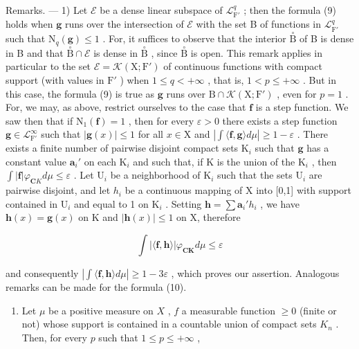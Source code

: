 Remarks. --- 1) Let \(\mathcal{E}\) be a dense linear subspace of \(\mathcal{L}_{\mathrm{F}'}^q\) ; then the formula (9) holds when \(\mathbf{g}\) runs over the intersection of \(\mathcal{E}\) with the set B of functions in \(\mathcal{L}_{\mathrm{F}'}^q\) such that \(\mathrm{N}_q(\mathbf{g}) \leqslant 1\) . For, it suffices to observe that the interior \(\overset{\circ}{\mathrm{B}}\) of B is dense in B and that \(\overset{\circ}{\mathrm{B}} \cap \mathcal{E}\) is dense in \(\overset{\circ}{\mathrm{B}}\) , since \(\overset{\circ}{\mathrm{B}}\) is open. This remark applies in particular to the set \(\mathcal{E} = \mathcal{K}(\mathrm{X};\mathrm{F}')\) of continuous functions with compact support (with values in \(\mathrm{F}'\) ) when \(1 \leqslant q < +\infty\) , that is, \(1 < p \leqslant +\infty\) . But in this case, the formula (9) is true as \(\mathbf{g}\) runs over \(\mathrm{B} \cap \mathcal{K}(\mathrm{X};\mathrm{F}')\) , even for \(p = 1\) . For, we may, as above, restrict ourselves to the case that \(\mathbf{f}\) is a step function. We saw then that if \(\mathrm{N}_1(\mathbf{f}) = 1\) , then for every \(\varepsilon > 0\) there exists a step function \(\mathbf{g} \in \mathcal{L}_{\mathrm{F}'}^{\infty}\) such that \(|\mathbf{g}(x)| \leqslant 1\) for all \(x \in \mathrm{X}\) and \(|\int \langle \mathbf{f},\mathbf{g}\rangle d\mu| \geqslant 1 - \varepsilon\) . There exists a finite number of pairwise disjoint compact sets \(\mathrm{K}_i\) such that \(\mathbf{g}\) has a constant value \(\mathbf{a}_i'\) on each \(\mathrm{K}_i\) and such that, if K is the union of the \(\mathrm{K}_i\) , then \(\int |\mathbf{f}| \varphi_{\mathbf{C} K} d\mu \leqslant \varepsilon\) . Let \(\mathrm{U}_i\) be a neighborhood of \(\mathrm{K}_i\) such that the sets \(\mathrm{U}_i\) are pairwise disjoint, and let \(h_i\) be a continuous mapping of X into {[}0,1{]} with support contained in \(\mathrm{U}_i\) and equal to 1 on \(\mathrm{K}_i\) . Setting \(\mathbf{h} = \sum \mathbf{a}_i' h_i\) , we have \(\mathbf{h}(x) = \mathbf{g}(x)\) on K and \(|\mathbf{h}(x)| \leqslant 1\) on X, therefore

\[
\int | \langle \mathbf {f}, \mathbf {h} \rangle | \varphi_ {\mathbf {C K}} d \mu \leqslant \varepsilon
\]

and consequently \(|\int \langle \mathbf{f},\mathbf{h}\rangle d\mu |\geqslant 1 - 3\varepsilon\) , which proves our assertion. Analogous remarks can be made for the formula (10).

\begin{enumerate}
\def\labelenumi{\arabic{enumi})}
\setcounter{enumi}{1}
\tightlist
\item
  Let \(\mu\) be a positive measure on \(X\) , \(f\) a measurable function \(\geqslant 0\) (finite or not) whose support is contained in a countable union of compact sets \(K_{n}\) . Then, for every \(p\) such that \(1 \leqslant p \leqslant +\infty\) ,
\end{enumerate}

